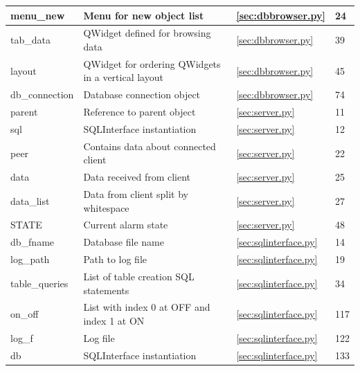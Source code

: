 \documentclass[a4paper]{article}
\begin{document}
\begin{table}[H]
\begin{tabular}{|l|l|l|l|}
    menu\_new     & Menu for new object list                           & \ref{sec:dbbrowser.py} & 24          \\ \hline
    tab\_data     & QWidget defined for browsing data                  & \ref{sec:dbbrowser.py} & 39          \\ \hline
    layout        & QWidget for ordering QWidgets in a vertical layout & \ref{sec:dbbrowser.py} & 45          \\ \hline
    db\_connection & Database connection object                         & \ref{sec:dbbrowser.py} & 74          \\ \hline
    parent        & Reference to parent object                         & \ref{sec:server.py} & 11          \\ \hline
    sql           & SQLInterface instantiation                         & \ref{sec:server.py} & 12          \\ \hline
    peer          & Contains data about connected client               & \ref{sec:server.py} & 22          \\ \hline
    data          & Data received from client                          & \ref{sec:server.py} & 25          \\ \hline
    data\_list    & Data from client split by whitespace               & \ref{sec:server.py} & 27          \\ \hline
    STATE         & Current alarm state                                & \ref{sec:server.py} & 48          \\ \hline
    db\_fname     & Database file name                                 & \ref{sec:sqlinterface.py} & 14          \\ \hline
    log\_path     & Path to log file                                   & \ref{sec:sqlinterface.py} & 19          \\ \hline
    table\_queries & List of table creation SQL statements              & \ref{sec:sqlinterface.py} & 34          \\ \hline
    on\_off       & List with index 0 at OFF and index 1 at ON         & \ref{sec:sqlinterface.py} & 117         \\ \hline
    log\_f        & Log file                                           & \ref{sec:sqlinterface.py} & 122         \\ \hline
    db            & SQLInterface instantiation                         & \ref{sec:sqlinterface.py} & 133         \\ \hline
    \end{tabular}
\end{table}
\end{document}
